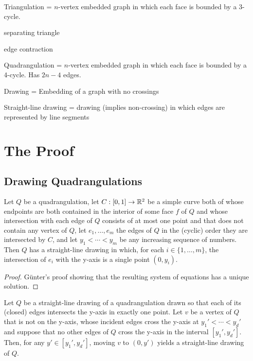 \documentclass{patmorin}
\begin{document}
Triangulation = $n$-vertex embedded graph in which each face is bounded by a 3-cycle.

separating triangle

edge contraction

Quadrangulation = $n$-vertex embedded graph in which each face is bounded by a 4-cycle. Has $2n-4$ edges.

Drawing = Embedding of a graph with no crossings

Straight-line drawing = drawing (implies non-crossing) in which edges are represented by line segments 


\section{The Proof}

\subsection{Drawing Quadrangulations}

\begin{lem}
    Let $Q$ be a quadrangulation, let $C:[0,1]\to\mathbb{R}^2$ be a simple curve
   both of whose endpoints are both contained in the interior of some
   face $f$ of $Q$ and whose intersection with each edge of $Q$ consists
   of at most one point and that does not contain
    any vertex of $Q$, let $e_1,\ldots,e_m$ the edges of $Q$ in the
    (cyclic) order they are intersected by $C$, and let $y_1<\cdots<y_m$
    be any increasing sequence of numbers.  Then $Q$ has a straight-line
    drawing in which, for each $i\in\{1,\ldots,m\}$, the intersection
    of $e_i$ with the y-axis is a single point $(0,y_i)$.
\end{lem}

\begin{proof}
   G\"unter's proof showing that the resulting system of equations has a unique solution.
\end{proof}

\begin{lem}
   Let $Q$ be a straight-line drawing of a quadrangulation drawn so
   that each of its (closed) edges intersects the y-axis in exactly one
   point. Let $v$ be a vertex of $Q$ that is not on the y-axis, whose
   incident edges cross the y-axis at $y_1'<\cdots<y_d'$ and suppose that
   no other edges of $Q$ cross the y-axis in the interval $[y_1',y_d']$.
   Then, for any $y'\in[y_1',y_d']$, moving $v$ to $(0,y')$ yields a
   straight-line drawing of $Q$.
\end{lem}
\end{document}

